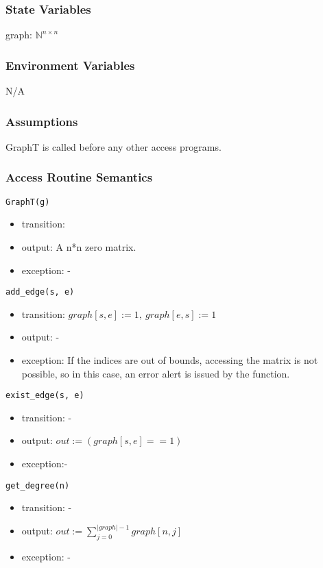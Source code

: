 \documentclass[12pt, titlepage]{article}
\begin{document}
\subsubsection{State Variables}

graph: ${\mathbb{N}}^ {n\times n}$ 


\subsubsection{Environment Variables}

N/A

\subsubsection{Assumptions}


{GraphT} is called before any other access programs.



\subsubsection{Access Routine Semantics}

\noindent \texttt{GraphT(g)}
\begin{itemize}
\item transition: 
\item output: A n*n zero matrix.
\item exception: -
\end{itemize}

\noindent \texttt{add\_edge(s, e)}
\begin{itemize}
\item transition: $graph[s,e]:=1,\ graph[e,s]:=1$
\item output: -
\item exception: If the indices are out of bounds, accessing the matrix is not possible, so in this case, an error alert is issued by the function.  
\end{itemize}

\noindent \texttt{exist\_edge(s, e)}
\begin{itemize}
\item transition: -
\item output: $out:= ( graph[s,e] ==1)$
\item exception:-  
\end{itemize}

\noindent \texttt{get\_degree(n)}
\begin{itemize}
\item transition: -
\item output: $out:= {\sum_{j=0}^{|graph|-1}{graph[n,j]}}$
\item exception: -
\end{itemize}
\end{document}
